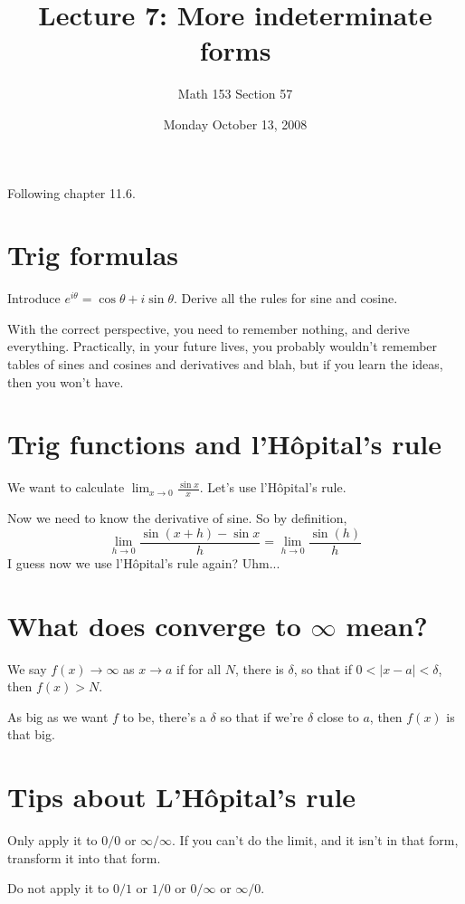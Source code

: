 \documentclass[12pt]{article}
\title{Lecture 7: More indeterminate forms}
\author{Math 153 Section 57}
\date{Monday October 13, 2008}
\begin{document}
\maketitle

Following chapter 11.6.

\section{Trig formulas}

Introduce $e^{i\theta} = \cos \theta + i \sin \theta$.  Derive
all the rules for sine and cosine.

With the correct perspective, you need to remember nothing, and derive
everything.  Practically, in your future lives, you probably wouldn't
remember tables of sines and cosines and derivatives and blah, but if
you learn the ideas, then you won't have.

\section{Trig functions and l'H\^opital's rule}

We want to calculate $\lim_{x \to 0} \frac{\sin x}{x}$.  Let's use
l'H\^opital's rule.

Now we need to know the derivative of sine.  So by definition,
$$
\lim_{h \to 0} \frac{\sin (x+h) - \sin x}{h} =
\lim_{h \to 0} \frac{\sin (h)}{h}
$$
I guess now we use l'H\^opital's rule again? Uhm...

\section{What does converge to $\infty$ mean?}

We say $f(x) \to \infty$ as $x \to a$ if for all $N$, there is $\delta$, so that if $0 < |x-a| < \delta$, then $f(x) > N$.

As big as we want $f$ to be, there's a $\delta$ so that if we're $\delta$ close to $a$, then $f(x)$ is that big.

\section{Tips about L'H\^opital's rule}

Only apply it to $0/0$ or $\infty/\infty$.  If you can't do the limit,
and it isn't in that form, transform it into that form.

Do not apply it to $0/1$ or $1/0$ or $0 / \infty$ or $\infty / 0$.
\end{document}
